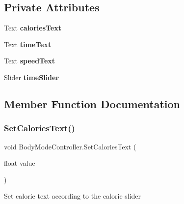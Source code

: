 \subsection*{Private Attributes}
\begin{DoxyCompactItemize}
\item 
\mbox{\label{class_body_mode_controller_a450019ae429816f5a3fddd3f803368ab}} 
Text {\bfseries calories\+Text}
\item 
\mbox{\label{class_body_mode_controller_a915086a6000d55e418d7a408d8fef31e}} 
Text {\bfseries time\+Text}
\item 
\mbox{\label{class_body_mode_controller_a8a648b04cf37f7df60c01e8845259dea}} 
Text {\bfseries speed\+Text}
\item 
\mbox{\label{class_body_mode_controller_a32527ef004ec262421a184eb38fc8c46}} 
Slider {\bfseries time\+Slider}
\end{DoxyCompactItemize}


\subsection{Member Function Documentation}
\mbox{\label{class_body_mode_controller_aca6fa173e7dd4bce1c7919bcfff20332}} 
\subsubsection{\texorpdfstring{Set\+Calories\+Text()}{SetCaloriesText()}}
{\footnotesize\ttfamily void Body\+Mode\+Controller.\+Set\+Calories\+Text (\begin{DoxyParamCaption}\item[{float}]{value }\end{DoxyParamCaption})}

Set calorie text according to the calorie slider \mbox{\label{class_body_mode_controller_af2c43f49b719a00d7ca1f5dc843e455e}} 
